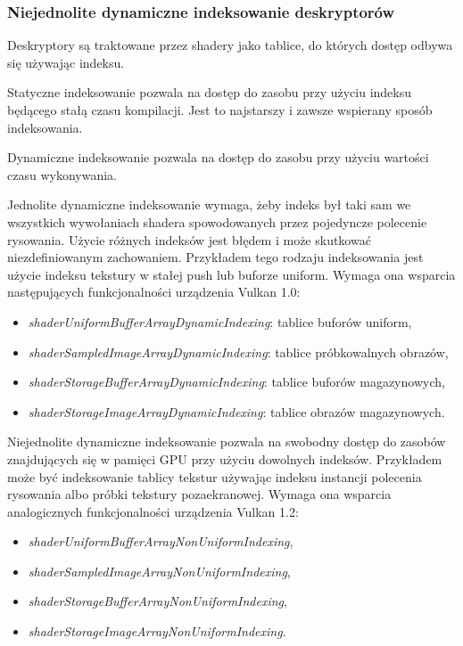 \subsubsection{Niejednolite dynamiczne indeksowanie deskryptorów}

Deskryptory są traktowane przez shadery jako tablice, do których dostęp odbywa się używając indeksu.

Statyczne indeksowanie pozwala na dostęp do zasobu przy użyciu indeksu będącego stałą czasu kompilacji. Jest to najstarszy i zawsze wspierany sposób indeksowania.

Dynamiczne indeksowanie pozwala na dostęp do zasobu przy użyciu wartości czasu wykonywania.

Jednolite dynamiczne indeksowanie wymaga, żeby indeks był taki sam we wszystkich wywołaniach shadera spowodowanych przez pojedyncze polecenie rysowania. Użycie różnych indeksów jest błędem i może skutkować niezdefiniowanym zachowaniem.
Przykładem tego rodzaju indeksowania jest użycie indeksu tekstury w stałej push lub buforze uniform.
Wymaga ona wsparcia następujących funkcjonalności urządzenia Vulkan 1.0:
\begin{itemize}
	\item {\textit{shaderUniformBufferArrayDynamicIndexing}}: tablice buforów uniform,
	\item {\textit{shaderSampledImageArrayDynamicIndexing}}: tablice próbkowalnych obrazów,
	\item {\textit{shaderStorageBufferArrayDynamicIndexing}}: tablice buforów magazynowych,
	\item {\textit{shaderStorageImageArrayDynamicIndexing}}: tablice obrazów magazynowych.
\end{itemize}

Niejednolite dynamiczne indeksowanie pozwala na swobodny dostęp do zasobów znajdujących się w pamięci GPU przy użyciu dowolnych indeksów.
Przykładem może być indeksowanie tablicy tekstur używając indeksu instancji polecenia rysowania albo próbki tekstury pozaekranowej.
Wymaga ona wsparcia analogicznych funkcjonalności urządzenia Vulkan 1.2:
\begin{itemize}
	\item {\textit{shaderUniformBufferArrayNonUniformIndexing}},
	\item {\textit{shaderSampledImageArrayNonUniformIndexing}},
	\item {\textit{shaderStorageBufferArrayNonUniformIndexing}},
	\item {\textit{shaderStorageImageArrayNonUniformIndexing}}.
\end{itemize}

